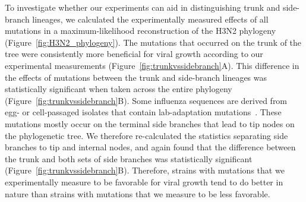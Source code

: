 \documentclass[9pt,twocolumn,twoside]{pnas-new}
\begin{document}
To investigate whether our experiments can aid in distinguishing trunk and side-branch lineages, we calculated the experimentally measured effects of all mutations in a maximum-likelihood reconstruction of the H3N2 phylogeny (Figure~\ref{fig:H3N2_phylogeny}).
The mutations that occurred on the trunk of the tree were consistently more beneficial for viral growth according to our experimental measurements (Figure~\ref{fig:trunkvssidebranch}A).
This difference in the effects of mutations between the trunk and side-branch lineages was statistically significant when taken across the entire phylogeny (Figure~\ref{fig:trunkvssidebranch}B).
Some influenza sequences are derived from egg- or cell-passaged isolates that contain lab-adaptation mutations~\citep{mcwhite2016sequence}.
These mutations mostly occur on the terminal side branches that lead to tip nodes on the phylogenetic tree.
We therefore re-calculated the statistics separating side branches to tip and internal nodes, and again found that the difference between the trunk and both sets of side branches was statistically significant (Figure~\ref{fig:trunkvssidebranch}B).
Therefore, strains with mutations that we experimentally measure to be favorable for viral growth tend to do better in nature than strains with mutations that we measure to be less favorable. 
\end{document}
